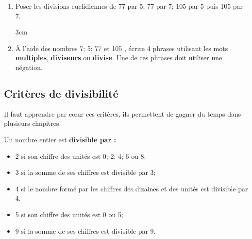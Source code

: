 \documentclass[a4paper]{book}
\begin{document}
    \begin{exemple}
        \begin{enumerate}
            \item Poser les divisions euclidiennes de 77 par 5; 77 par 7; 105 par 5 puis 105 par 7.

            \begin{ZoneReponse}{3cm}
            \end{ZoneReponse}

            \item À l'aide des nombres 7; 5; 77 et 105 , écrire 4 phrases utilisant les mots \textbf{multiples}, \textbf{diviseurs} ou \textbf{divise}. Une de ces phrases doit utiliser une négation.
    
            \begin{minipage}{0.45\linewidth}  
                \text{}
                \vspace{3cm}
            \end{minipage}
            \hfill
            \vline
            \hfill
            \begin{minipage}{0.45\linewidth}
                \text{}
                 
                \vspace{3cm}
            \end{minipage}
        \end{enumerate}   
    \end{exemple}


\newpage


\subsection{Critères de divisibilité}
    Il faut apprendre par cœur ces critères, ils permettent de gagner du temps dans plusieurs chapitres.

    \begin{propriete}
        Un nombre entier est \textbf{divisible par :}
            \begin{itemize}
                \item 2 si son chiffre des unités est 0; 2; 4; 6 ou 8;
                \item 3 si la somme de ses chiffres est divisible par 3;
                \item 4 si le nombre formé par les chiffres des dizaines et des unités est divisible par 4.
                \item 5 si son chiffre des unités est 0 ou 5;
                \item 9 si la somme de ses chiffres est divisible par 9.
            \end{itemize}
    \end{propriete}
\end{document}
